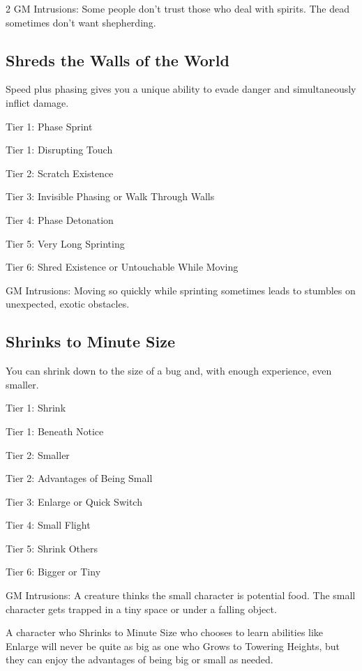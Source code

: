 \begin{multicols}{2}
GM Intrusions: Some people don’t trust those who deal with spirits. The dead sometimes don’t want shepherding.

\subsection{Shreds the Walls of the World}

Speed plus phasing gives you a unique ability to evade danger and simultaneously inflict damage.

Tier 1: Phase Sprint

Tier 1: Disrupting Touch

Tier 2: Scratch Existence

Tier 3: Invisible Phasing or Walk Through Walls

Tier 4: Phase Detonation

Tier 5: Very Long Sprinting

Tier 6: Shred Existence or Untouchable While Moving

GM Intrusions: Moving so quickly while sprinting sometimes leads to stumbles on unexpected, exotic obstacles.

\subsection{Shrinks to Minute Size}

You can shrink down to the size of a bug and, with enough experience, even smaller. 

Tier 1: Shrink

Tier 1: Beneath Notice

Tier 2: Smaller

Tier 2: Advantages of Being Small

Tier 3: Enlarge or Quick Switch

Tier 4: Small Flight

Tier 5: Shrink Others

Tier 6: Bigger or Tiny

GM Intrusions: A creature thinks the small character is potential food. The small character gets trapped in a tiny space or under a falling object.

	A character who Shrinks to Minute Size who chooses to learn abilities like Enlarge will never be quite as big as one who Grows to Towering Heights, but they can enjoy the advantages of being big or small as needed.


\end{multicols}
